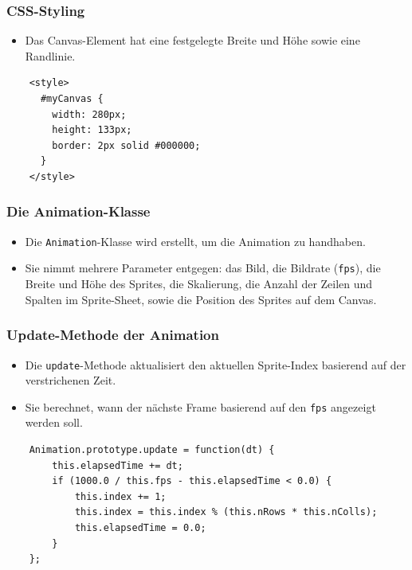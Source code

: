 \documentclass{beamer}
\begin{document}
\begin{frame}[fragile]
    \frametitle{CSS-Styling}
    \begin{itemize}
        \item Das Canvas-Element hat eine festgelegte Breite und Höhe sowie eine Randlinie.
    \end{itemize}
    \begin{verbatim}
    <style>
      #myCanvas {
        width: 280px;
        height: 133px;
        border: 2px solid #000000;
      }
    </style>
    \end{verbatim}
\end{frame}

\begin{frame}
    \frametitle{Die Animation-Klasse}
    \begin{itemize}
        \item Die \texttt{Animation}-Klasse wird erstellt, um die Animation zu handhaben.
        \item Sie nimmt mehrere Parameter entgegen: das Bild, die Bildrate (\texttt{fps}), die Breite und Höhe des Sprites, die Skalierung, die Anzahl der Zeilen und Spalten im Sprite-Sheet, sowie die Position des Sprites auf dem Canvas.
    \end{itemize}
\end{frame}

\begin{frame}[fragile]
    \frametitle{Update-Methode der Animation}
    \begin{itemize}
        \item Die \texttt{update}-Methode aktualisiert den aktuellen Sprite-Index basierend auf der verstrichenen Zeit.
        \item Sie berechnet, wann der nächste Frame basierend auf den \texttt{fps} angezeigt werden soll.
    \end{itemize}
    \begin{verbatim}
    Animation.prototype.update = function(dt) {
        this.elapsedTime += dt;
        if (1000.0 / this.fps - this.elapsedTime < 0.0) {
            this.index += 1;
            this.index = this.index % (this.nRows * this.nColls);
            this.elapsedTime = 0.0;
        }
    };
    \end{verbatim}
\end{frame}
\end{document}
